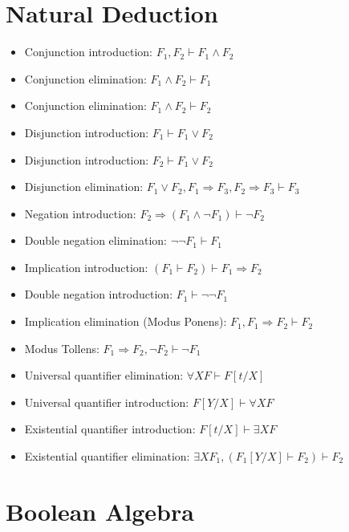 \documentclass[11pt, twocolumn]{article}
\newenvironment{compactitem}
{\begin{itemize}
  \setlength{\itemsep}{1px}
  \setlength{\parskip}{0pt}
  \setlength{\parsep}{0pt}}
{\end{itemize}}
\begin{document}
\section{Natural Deduction}
\begin{compactitem}
\item Conjunction introduction: $F_1, F_2 \vdash F_1 \wedge F_2$
\item Conjunction elimination: $F_1 \wedge F_2 \vdash F_1$
\item Conjunction elimination: $F_1 \wedge F_2 \vdash F_2$
\item Disjunction introduction: $F_1 \vdash F_1\vee F_2$
\item Disjunction introduction: $F_2 \vdash F_1\vee F_2$
\item Disjunction elimination: $F_1 \vee F_2, F_1\Rightarrow F_3, F_2\Rightarrow F_3 \vdash F_3$
\item Negation introduction: $F_2 \Rightarrow (F_1 \wedge \neg F_1) \vdash \neg F_2$
\item Double negation elimination: $\neg \neg F_1 \vdash F_1$
\item Implication introduction: $(F_1 \vdash F_2)\vdash F_1\Rightarrow F_2$
\item Double negation introduction: $F_1 \vdash \neg\neg F_1$
\item Implication elimination (Modus Ponens): $F_1, F_1 \Rightarrow F_2 \vdash F_2$
\item Modus Tollens: $F_1\Rightarrow F_2, \neg F_2 \vdash \neg F_1$
\item Universal quantifier elimination: $\forall X F \vdash F[t/X]$
\item Universal quantifier introduction: $F[Y/X] \vdash \forall X F$
\item Existential quantifier introduction: $F[t/X] \vdash \exists X F$
\item Existential quantifier elimination: $\exists X F_1, (F_1[Y/X] \vdash F_2) \vdash F_2$
\end{compactitem}
\section{Boolean Algebra}
\end{document}
